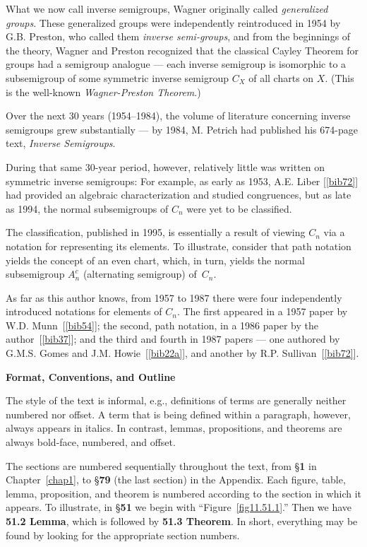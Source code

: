 \documentclass{surv-l}
\numberwithin{equation}{section}
\numberwithin{table}{section}
\numberwithin{figure}{section}
\theoremstyle{plain}
\theoremstyle{definition}
\begin{document}
What we now call inverse semigroups, Wagner originally called
\emph{generalized groups}. These
generalized groups were independently reintroduced in 1954 by G.B.
Preston, who called them \emph{inverse
semi-groups}, and from the beginnings
of the theory, Wagner and Preston recognized that the classical
Cayley Theorem for groups had a semigroup
analogue
--- each inverse semigroup is isomorphic to a subsemigroup of some
symmetric inverse semigroup $C_{X}$ of all charts on $X$. (This is
the well-known \emph{Wagner-Preston Theorem}.)

Over the next 30 years (1954--1984), the volume of literature
concerning inverse semigroups grew substantially --- by 1984, M.
Petrich had published his 674-page text, \emph{Inverse
Semigroups}.

During that same 30-year period, however, relatively little was
written on symmetric inverse semigroups: For example, as early as
1953, A.E. Liber
[\ref{bib72}] had provided an algebraic
characterization and studied congruences, but as late as 1994, the
normal subsemigroups of $C_{n}$ were yet to be classified.

The classification, published in 1995, is essentially a result of
viewing $C_{n}$ via a notation for representing its elements. To
illustrate, consider that path notation yields the concept of an
even chart, which, in turn, yields the normal subsemigroup
$A_{n}^{c}$ (alternating semigroup) of~$C_{n}$.

As far as this author knows, from 1957 to 1987 there were four
independently introduced notations for elements of $C_{n}$. The
first appeared in a 1957 paper by W.D. Munn~[\ref{bib54}]; the second, path notation,
in a 1986 paper by the author~[\ref{bib37}]; and
the third and fourth in 1987 papers --- one authored by G.M.S.
Gomes and J.M. Howie~[\ref{bib22a}], and another by R.P.
Sullivan~[\ref{bib72}].

\textbf{Format, Conventions, and Outline}

The style of the text is informal, e.g., definitions of terms are
generally neither numbered nor offset. A term that is being
defined within a paragraph, however, always appears in italics. In
contrast, lemmas, propositions, and theorems are always bold-face,
numbered, and offset.

The sections are numbered sequentially throughout the text, from
\S\textbf{1} in Chapter~\ref{chap1}, to \S\textbf{79} (the
last section) in the Appendix. Each figure, table, lemma,
proposition, and theorem is numbered according to the section in
which it appears. To illustrate, in \S\textbf{51} we begin with
``Figure~\ref{fig11.51.1}.'' Then we have \textbf{51.2 Lemma},
which is followed by \textbf{51.3 Theorem}. In short,
everything may be found by looking for the appropriate section
numbers.
\end{document}
